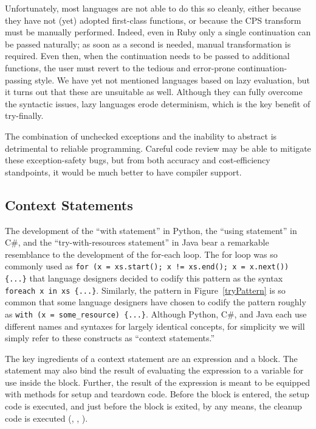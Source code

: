 \documentclass[11pt]{article}
\newcommand{\maybePage}{\null}
\begin{document}
Unfortunately, most languages are not able to do this so cleanly, either because they have not (yet) adopted first-class functions, or because the CPS transform must be manually performed.
Indeed, even in Ruby only a single continuation can be passed naturally; as soon as a second is needed, manual transformation is required.
Even then, when the continuation needs to be passed to additional functions, the user must revert to the tedious and error-prone continuation-passing style.
We have yet not mentioned languages based on lazy evaluation, but it turns out that these are unsuitable as well.
Although they can fully overcome the syntactic issues, lazy languages erode determinism, which is the key benefit of try-finally.

The combination of unchecked exceptions and the inability to abstract is detrimental to reliable programming.
Careful code review may be able to mitigate these exception-safety bugs, but from both accuracy and cost-efficiency standpoints, it would be much better to have compiler support.


\maybePage
\subsection{Context Statements}
\label{context statements}

The development of the ``with statement'' in Python, the ``using statement'' in C\#, and the ``try-with-resources statement'' in Java bear a remarkable resemblance to the development of the for-each loop.
The for loop was so commonly used as \texttt{for (x = xs.start(); x != xs.end(); x = x.next()) \{...\}} that language designers decided to codify this pattern as the syntax \texttt{foreach x in xs \{...\}}.
Similarly, the pattern in Figure~\ref{tryPattern} is so common that some language designers have chosen to codify the pattern roughly as \texttt{with (x = some\_resource) \{...\}}.
Although Python, C\#, and Java each use different names and syntaxes for largely identical concepts, for simplicity we will simply refer to these constructs as ``context statements.''

The key ingredients of a context statement are an expression and a block.
The statement may also bind the result of evaluating the expression to a variable for use inside the block.
Further, the result of the expression is meant to be equipped with methods for setup and teardown code.
Before the block is entered, the setup code is executed, and just before the block is exited, by any means, the cleanup code is executed (\cite{JavaStandard}, \cite{PEP343}, \cite{cSharpStandard}).
\end{document}
